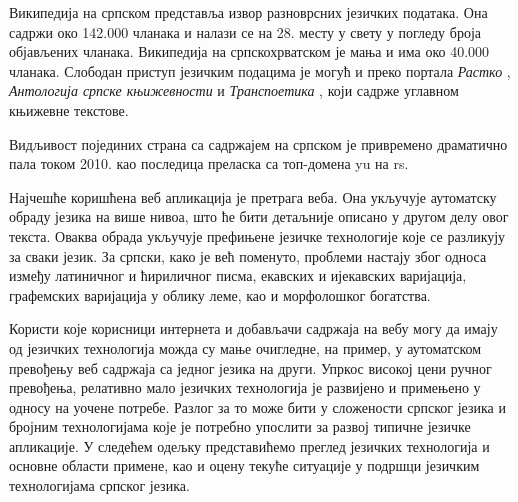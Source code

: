 \begin{multicols}{2}
Википедија на српском представља извор разноврсних језичких података. Она садржи око 142.000 чланака и налази се на  28. месту \cite{WIKI} у свету у погледу броја објављених чланака. Википедија на српскохрватском \cite{SHWIKI}   је мања и  има око 40.000 чланака. Слободан приступ језичким подацима је могућ и преко портала \textit{Растко} \cite{RASTKO},  \textit{Антологија српске књижевности} \cite{ASK} и \textit{Транспоетика} \cite{TRPOET}, који садрже углавном књижевне текстове.
 
Видљивост појединих страна са садржајем на српском је привремено драматично пала током 2010. као последица преласка са топ-домена yu на rs. 

Најчешће коришћена веб апликација је претрага веба. Она укључује аутоматску обраду језика на више нивоа, што ће бити детаљније описано у другом делу овог текста.  Оваква обрада укључује префињене језичке технологије које се разликују за сваки језик.  За српски, како је већ поменуто,  проблеми настају због односа између латиничног и ћириличног писма,  екавских и ијекавских варијација, графемских варијација у облику леме, као и морфолошког богатства. 

Користи које корисници интернета и добављачи садржаја на вебу могу да имају од језичких технологија можда су мање очигледне, на пример, у аутоматском превођењу веб садржаја са једног језика на други. Упркос високој цени ручног превођења, релативно мало језичких технологија је развијено и примењено у односу на уочене потребе.  Разлог за то може бити у сложености српског језика и бројним технологијама које је потребно упослити за развој типичне језичке апликације. У следећем одељку представићемо преглед језичких технологија и основне области примене,  као и оцену текуће ситуације у подршци језичким технологијама српског језика.
\end{multicols}

\clearpage

